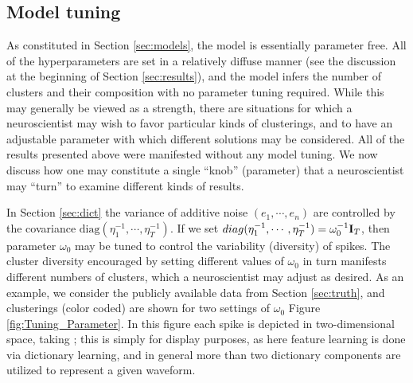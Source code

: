 \documentclass[journal]{IEEEtran}
\begin{document}
\subsection{Model tuning}

As constituted in Section \ref{sec:models}, the model is essentially parameter free. All of the hyperparameters are set in a relatively diffuse manner (see the discussion at the beginning of Section \ref{sec:results}), and the model infers the number of clusters and their composition with no parameter tuning required. While this may generally be viewed as a strength, there are situations for which a neuroscientist may wish to favor particular kinds of clusterings, and to have an adjustable parameter with which different solutions may be considered. All of the results presented above were manifested without any model tuning. We now discuss how one may constitute a single ``knob'' (parameter) that a neuroscientist may ``turn'' to examine different kinds of results.


In Section \ref{sec:dict} the variance of additive noise $(e_1,\cdots, e_n)$ are controlled by the covariance $\mbox{diag}(\eta_1^{-1},\cdots, \eta_T^{-1})$. If we set $\relax{diag}(\eta_1^{-1},\cdots, \eta_T^{-1})=\omega_0^{-1}{\mathbf I}_T$, then parameter $\omega_0$ may be tuned to control the variability (diversity) of spikes. The cluster diversity encouraged by setting different values of $\omega_0$ in turn manifests different numbers of clusters, which a neuroscientist may adjust as desired. As an example, we consider the publicly available data from Section \ref{sec:truth}, and clusterings (color coded) are shown for two settings of $\omega_0$  Figure \ref{fig:Tuning_Parameter}. In this figure\add{,} each spike is depicted in two-dimensional  space, taking ; this is simply for display purposes, as here feature learning is done via dictionary learning, and in general more than two dictionary components are utilized to represent a given waveform.
\end{document}
